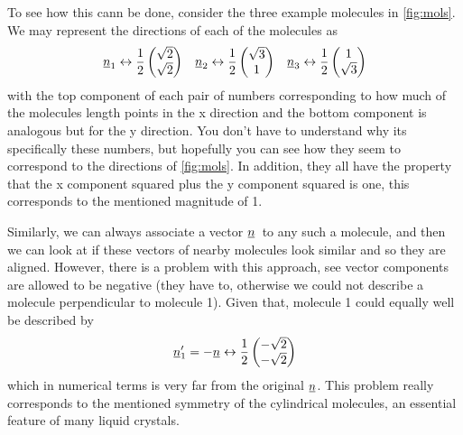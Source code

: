 \documentclass[a4paper,11pt]{article}
\newcommand{\suf}[2]{\stackunder[0.5pt]{\stackunder[1pt]{\ensuremath{#1}}{\rule{\widthof{\ensuremath{#2}}*\real{0.9}}{.1ex}}}{}}
\newcommand{\su}[1]{\suf{#1}{#1}}
\newcommand{\nn}{\ensuremath{\su{n}}}
\begin{document}
\begin{multicols}{2}
    To see how this cann be done, consider the three example molecules in \cref{fig:mols}.
    We may represent the directions of each of the molecules as
    \begin{align*}
        \su{n}_1 \leftrightarrow \frac{1}{2} \begin{pmatrix} \sqrt{2} \\ \sqrt{2} \end{pmatrix} && 
        \su{n}_2 \leftrightarrow \frac{1}{2} \begin{pmatrix} \sqrt{3} \\ 1 \end{pmatrix} &&
        \su{n}_3 \leftrightarrow \frac{1}{2} \begin{pmatrix} 1 \\ \sqrt{3} \end{pmatrix}
    \end{align*}
    with the top component of each pair of numbers corresponding to how much of the molecules length points in the x direction and the bottom component is analogous but for the y direction.
    You don't have to understand why its specifically these numbers, but hopefully you can see how they seem to correspond to the directions of \cref{fig:mols}.
    In addition, they all have the property that the x component squared plus the y component squared is one, this corresponds to the mentioned magnitude of 1.

    \raggedcolumns
    Similarly, we can always associate a vector \nn\ to any such a molecule, and then we can look at if these vectors of nearby molecules look similar and so they are aligned.
    However, there is a problem with this approach, see vector components are allowed to be negative (they have to, otherwise we could not describe a molecule perpendicular to molecule 1).
    Given that, molecule 1 could equally well be described by
    \begin{equation}\label{eq:dyad}
        \su{n}_1' = -\su{n} \leftrightarrow \frac{1}{2}\begin{pmatrix} -\sqrt{2} \\ -\sqrt{2} \end{pmatrix}
    \end{equation}
    which in numerical terms is very far from the original \nn.
    This problem really corresponds to the mentioned symmetry of the cylindrical molecules, an essential feature of many liquid crystals.


\end{multicols}
\end{document}

